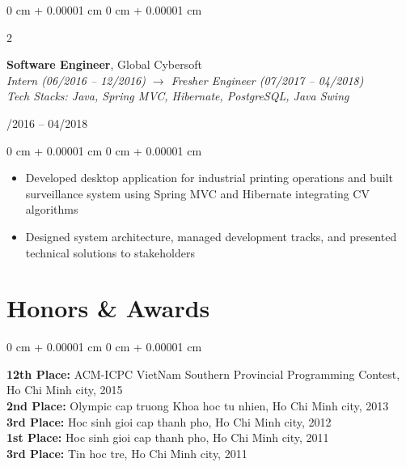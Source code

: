 \documentclass[10pt, letterpaper]{article}
\newenvironment{highlights}{
    \begin{itemize}[
        topsep=0.10 cm,
        parsep=0.10 cm,
        partopsep=0pt,
        itemsep=0pt,
        leftmargin=0 cm + 10pt
    ]
}{
    \end{itemize}
}
\newenvironment{onecolentry}{
    \begin{adjustwidth}{
        0 cm + 0.00001 cm
    }{
        0 cm + 0.00001 cm
    }
}{
    \end{adjustwidth}
}
\newenvironment{twocolentry}[2][]{
    \onecolentry
    \def\secondColumn{#2}
    \setcolumnwidth{\fill, 4.5 cm}
    \begin{paracol}{2}
}{
    \switchcolumn \raggedleft \secondColumn
    \end{paracol}
    \endonecolentry
}
\begin{document}
    \vspace{0.3cm}

    \begin{twocolentry}{06/2016 -- 04/2018}
        \textbf{Software Engineer}, Global Cybersoft\\
        \textit{Intern (06/2016 -- 12/2016) $\rightarrow$ Fresher Engineer (07/2017 -- 04/2018)}\\
        \textit{Tech Stacks: Java, Spring MVC, Hibernate, PostgreSQL, Java Swing}
    \end{twocolentry}
    \vspace{0.15cm}
    \begin{onecolentry}
        \begin{highlights}
            \item Developed desktop application for industrial printing operations and built surveillance system using Spring MVC and Hibernate integrating CV algorithms

            \item Designed system architecture, managed development tracks, and presented technical solutions to stakeholders
        \end{highlights}

    \end{onecolentry}
    \vspace{0.3cm}

    \section{Honors \& Awards}
    \begin{onecolentry}
        \textbf{12th Place:} ACM-ICPC VietNam Southern Provincial Programming Contest, Ho Chi Minh city, 2015\\
        \textbf{2nd Place:} Olympic cap truong Khoa hoc tu nhien, Ho Chi Minh city, 2013\\
        \textbf{3rd Place:} Hoc sinh gioi cap thanh pho, Ho Chi Minh city, 2012\\
        \textbf{1st Place:} Hoc sinh gioi cap thanh pho, Ho Chi Minh city, 2011\\
        \textbf{3rd Place:} Tin hoc tre, Ho Chi Minh city, 2011
    \end{onecolentry}
    \vspace{0.3cm}

\end{document}
